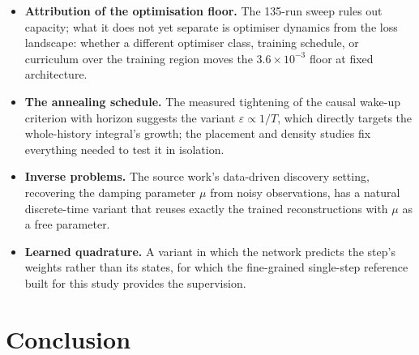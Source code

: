 \documentclass[11pt,a4paper]{article}
\begin{document}
\begin{itemize}
  \item \textbf{Attribution of the optimisation floor.} The 135-run sweep
  rules out capacity; what it does not yet separate is optimiser dynamics
  from the loss landscape: whether a different optimiser class, training
  schedule, or curriculum over the training region moves the
  $3.6\times10^{-3}$ floor at fixed architecture.
  \item \textbf{The annealing schedule.} The measured tightening of the
  causal wake-up criterion with horizon suggests the variant
  $\varepsilon \propto 1/T$, which directly targets the whole-history
  integral's growth; the placement and density studies fix everything
  needed to test it in isolation.
  \item \textbf{Inverse problems.} The source work's data-driven discovery
  setting, recovering the damping parameter $\mu$ from noisy
  observations, has a natural discrete-time variant that reuses exactly
  the trained reconstructions with $\mu$ as a free parameter.
  \item \textbf{Learned quadrature.} A variant in which the network
  predicts the step's weights rather than its states, for which the
  fine-grained single-step reference built for this study provides the
  supervision.
\end{itemize}

\section{Conclusion}
\label{sec:conclusion}
\end{document}
